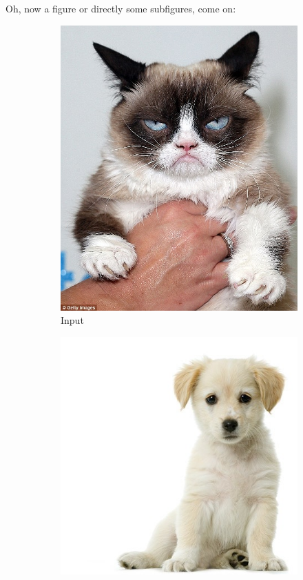 \documentclass[12pt,oneside,notitlepage,abstracton,a4paper]{scrartcl}
\begin{document}
Oh, now a figure or directly some subfigures, come on:
\begin{figure}[h]
\centering
\begin{subfigure}[t]{0.4\textwidth}
	\centering
	\includegraphics[width=1\textwidth]{img/cat.jpg}
	\caption{Input}
    \label{subfigure}
\end{subfigure}
	\hspace*{0.8cm} %
\begin{subfigure}[t]{0.4\textwidth}
	\centering
	\includegraphics[width=1\textwidth]{img/dog.jpg}

\end{subfigure}
\end{figure}
\end{document}
